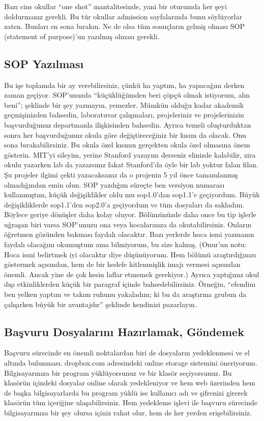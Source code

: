 \documentclass[12pt]{article}
\begin{document}
Bazı cins okullar ``one shot'' mantalitesinde, yani bir oturumda her şeyi doldurmanız gerekli. Bu tür okullar admission sayfalarında bunu söylüyorlar zaten. Bunları en sona bırakın. Ne de olsa tüm sonuçların gelmiş olması SOP (statement of purpose)'un yazılmış olması gerekli. 

\subsection{SOP Yazılması}
Bu işe toplamda bir ay verebilirsiniz, çünkü ha yaptım, ha yapacağım derken zaman geçiyor. SOP'unuzda ``küçüklüğümden beri çöpçü olmak istiyorum, alın beni''; şeklinde bir şey yazmayın, yemezler. Mümkün olduğu kadar akademik geçmişinizden bahsedin, laboratuvar çalışmaları, projeleriniz ve projelerinizin başvurduğunuz departmanla ilişkisinden bahsedin. Ayrıca temeli oluşturduktan sonra her başvurduğunuz okula göre değiştireceğiniz bir kısım da olacak. Onu sona bırakabilirsiniz. Bu okula özel kısmın gerçekten okula özel olmasına önem gösterin. MIT'yi sileyim, yerine Stanford yazayım derseniz elinizde kalabilir, zira okulu yazarken lab da yazarsınız fakat Stanford'da öyle bir lab yoktur falan filan. Şu projeler ilgimi çekti yazacaksanız da o projenin 5 yıl önce tamamlanmış olmadığından emin olun. SOP yazdığım süreçte ben versiyon numarası kullanmıştım, küçük değişiklikler oldu mu sop1.0’dan sop1.1’e geçiyordum. Büyük değişikliklerde sop1.1’den sop2.0’a geçiyordum ve tüm dosyaları da sakladım. Böylece geriye dönüşler daha kolay oluyor. Bölümünüzde daha once bu tip işlerle uğraşan biri varsa SOP'unuzu ona veya hocalarınıza da okutabilirsiniz. Onların öğretmen gözünden bakması faydalı olacaktır. Bazı yerlerde hoca ismi yazmanın faydalı olacağını okumuştum ama bilmiyorum, bu size kalmış. (Onur'un notu: Hoca ismi belirtmek iyi olacaktır diye düşünüyorum. Hem bölümü araştırdığınızı göstermek açısından, hem de bir hedefe kitlenmişlik imajı vermesi açısından önemli. Ancak yine de çok kesin laflar etmemek gerekiyor.) Ayrıca yaptığınız okul dışı etkinliklerden küçük bir paragraf içinde bahsedebilirsiniz. Örneğin, ``efendim ben yelken yaptım ve takım ruhunu yakaladım; ki bu da araştırma grubun da çalışırken büyük bir avantajdır'' şeklinde  kendinizi pazarlayın. 

\subsection{Başvuru Dosyalarını Hazırlamak, Göndemek}
Başvuru sürecinde en önemli noktalardan biri de dosyaların yedeklenmesi ve el altında bulunması. dropbox.com adresindeki online storage sistemini öneriyorum. Bilgisayarınıza bir program yüklüyorsunuz ve bir klasör seçiyorsunuz. Bu klasörün içindeki dosyalar online olarak yedekleniyor ve hem web üzerinden hem de başka bilgisayarlarda bu program yüklü ise kullanıcı adı ve şifrenizi girerek klasörün tüm içeriğine ulaşabilirsiniz. Hem yedekleme işlevi ile başvuru sürecinde bilgisayarınıza bir şey olursa içiniz rahat olur, hem de her yerden erişebilirsiniz. 
\end{document}
